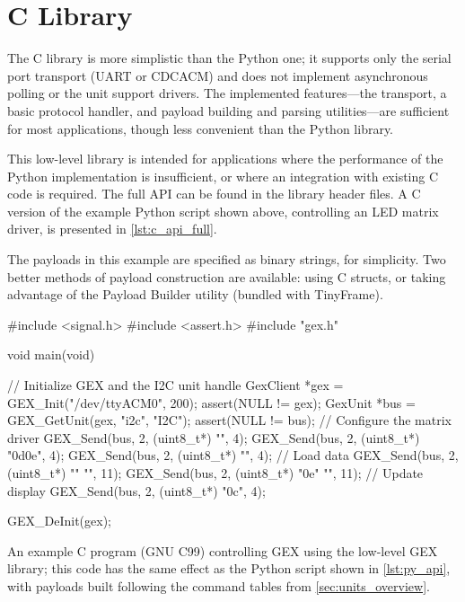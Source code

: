 \section{C Library}

The C library is more simplistic than the Python one; it supports only the serial port transport (\gls{UART} or \gls{CDCACM}) and does not implement asynchronous polling or the unit support drivers. The implemented features---the transport, a basic protocol handler, and payload building and parsing utilities---are sufficient for most applications, though less convenient than the Python library.

This low-level library is intended for applications where the performance of the Python implementation is insufficient, or where an integration with existing C code is required. The full \gls{API} can be found in the library header files. A C version of the example Python script shown above, controlling an \gls{LED} matrix driver, is presented in \cref{lst:c_api_full}. 

The payloads in this example are specified as binary strings, for simplicity. Two better methods of payload construction are available: using C structs, or taking advantage of the Payload Builder utility (bundled with TinyFrame).

\begin{listing}
	\begin{ccode}
	#include <signal.h>
	#include <assert.h>
	#include "gex.h"
			
	void main(void)
	{
	    // Initialize GEX and the I2C unit handle
	    GexClient *gex = GEX_Init("/dev/ttyACM0", 200);
	    assert(NULL != gex);        
	    GexUnit *bus = GEX_GetUnit(gex, "i2c", "I2C");
	    assert(NULL != bus);	    	    
	    // Configure the matrix driver
	    GEX_Send(bus, 2, (uint8_t*) "\x00", 4);
	    GEX_Send(bus, 2, (uint8_t*) "\x0d\x0e", 4);
	    GEX_Send(bus, 2, (uint8_t*) "", 4);	    
	    // Load data
	    GEX_Send(bus, 2, (uint8_t*) ""
	                                "\xAA{}\xAA{}\xAA{}\xAA{}", 11);
	    GEX_Send(bus, 2, (uint8_t*) "\x0e"
	                                "\xFF{}\xFF{}\xFF{}\xFF{}", 11);
	    // Update display
	    GEX_Send(bus, 2, (uint8_t*) "\x0c", 4);
	    	    
	    GEX_DeInit(gex);
	}    
	\end{ccode}
	\caption{\label{lst:c_api_full} An example C program (GNU C99) controlling GEX using the low-level GEX library; this code has the same effect as the Python script shown in \cref{lst:py_api}, with payloads built following the command tables from \cref{sec:units_overview}.}
\end{listing}

